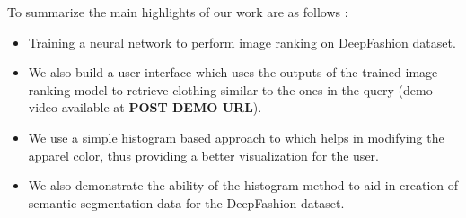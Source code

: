 To summarize the main highlights of our work are as follows :
\begin{itemize}
    \item Training a neural network to perform image ranking on DeepFashion dataset.
    \item We also build a user interface which uses the outputs of the trained image ranking model to retrieve clothing similar to the ones in the query (demo video available at \textbf{POST DEMO URL}).
    \item We use a simple histogram based approach to which helps in modifying the apparel color, thus providing a better visualization for the user.
    \item We also demonstrate the ability of the histogram method to aid in creation of semantic segmentation data for the DeepFashion dataset.
\end{itemize}